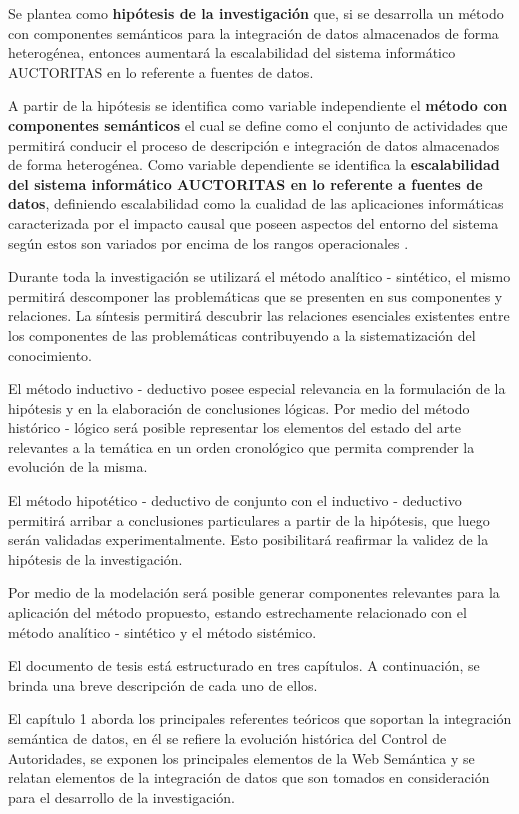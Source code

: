 Se plantea como \textbf{hipótesis de la investigación} que, si se desarrolla un método con componentes semánticos para la integración de datos almacenados de forma heterogénea, entonces aumentará la escalabilidad del sistema informático AUCTORITAS en lo referente a fuentes de datos.

A partir de la hipótesis se identifica como variable independiente el \textbf{método con componentes semánticos} el cual se define como el conjunto de actividades \citep{Offermann2010} que permitirá conducir el proceso de descripción e integración de datos almacenados de forma heterogénea. Como variable dependiente se identifica la \textbf{escalabilidad del sistema informático AUCTORITAS en lo referente a fuentes de datos}, definiendo escalabilidad como la cualidad de las aplicaciones informáticas caracterizada por el impacto causal que poseen aspectos del entorno del sistema según estos son variados por encima de los rangos operacionales \citep{duboc2006framework}.

Durante toda la investigación se utilizará el método analítico - sintético, el mismo permitirá descomponer las problemáticas que se presenten en sus componentes y relaciones. La síntesis permitirá descubrir las relaciones esenciales existentes entre los componentes de las problemáticas contribuyendo a la sistematización del conocimiento. 

El método inductivo - deductivo posee especial relevancia en la formulación de la hipótesis y en la elaboración de conclusiones lógicas. Por medio del método histórico - lógico será posible representar los elementos del estado del arte relevantes a la temática en un orden cronológico que permita comprender la evolución de la misma.

El método hipotético - deductivo de conjunto con el inductivo - deductivo permitirá arribar a conclusiones particulares a partir de la hipótesis, que luego serán validadas experimentalmente. Esto posibilitará reafirmar la validez de la hipótesis de la investigación.

Por medio de la modelación será posible generar componentes relevantes para la aplicación del método propuesto, estando estrechamente relacionado con el método analítico - sintético y el método sistémico.

El documento de tesis está estructurado en tres capítulos. A continuación, se brinda una breve descripción de cada uno de ellos.

El capítulo 1 aborda los principales referentes teóricos que soportan la integración semántica de datos, en él se refiere la evolución histórica del Control de Autoridades, se exponen los principales elementos de la Web Semántica y se relatan elementos de la integración de datos que son tomados en consideración para el desarrollo de la investigación.
